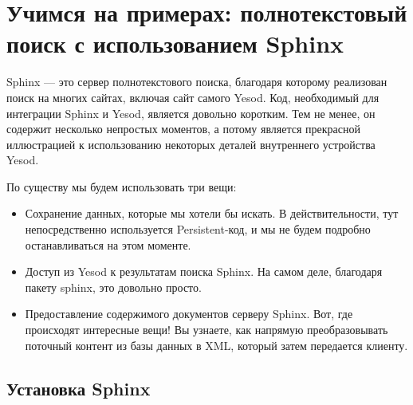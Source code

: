 \chapter{Учимся на примерах: полнотекстовый поиск с использованием Sphinx} %



Sphinx --- это сервер полнотекстового поиска, благодаря которому реализован поиск на многих сайтах, включая сайт самого Yesod. Код, необходимый для интеграции Sphinx и Yesod, является довольно коротким. Тем не менее, он содержит несколько непростых моментов, а потому является прекрасной иллюстрацией к использованию некоторых деталей внутреннего устройства Yesod. %

По существу мы будем использовать три вещи: %

\begin{itemize}
  \item Сохранение данных, которые мы хотели бы искать. В действительности, тут непосредственно используется Persistent-код, и мы не будем подробно останавливаться на этом моменте. %
  \item Доступ из Yesod к результатам поиска Sphinx. На самом деле, благодаря пакету sphinx, это довольно просто.
  \item Предоставление содержимого документов серверу Sphinx. Вот, где происходят интересные вещи! Вы узнаете, как напрямую преобразовывать поточный контент из базы данных в XML, который затем передается клиенту. %
\end{itemize}

\section{Установка Sphinx} %

